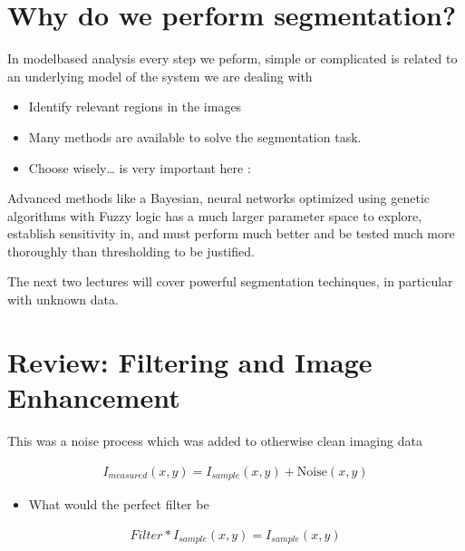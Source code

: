 \documentclass[letterpaper,10pt,english]{sphinxmanual}
\begin{document}
\section{Why do we perform segmentation?}
\label{\detokenize{04-BasicSegmentation:why-do-we-perform-segmentation}}
\sphinxAtStartPar
In model\sphinxhyphen{}based analysis every step we peform, simple or complicated is related to an underlying model of the system we are dealing with
\begin{itemize}
\item {} 
\sphinxAtStartPar
Identify relevant regions in the images

\item {} 
\sphinxAtStartPar
Many methods are available to solve the segmentation task.

\item {} 
\sphinxAtStartPar
Choose wisely…  is very important here : 

\end{itemize}

\sphinxAtStartPar
Advanced methods like a Bayesian, neural networks optimized using genetic algorithms with Fuzzy logic has a much larger parameter space to explore, establish sensitivity in, and must perform much better and be tested much more thoroughly than thresholding to be justified.

\sphinxAtStartPar
The next two lectures will cover powerful segmentation techinques, in particular with unknown data.


\section{Review: Filtering and Image Enhancement}
\label{\detokenize{04-BasicSegmentation:review-filtering-and-image-enhancement}}
\sphinxAtStartPar
This was a noise process which was added to otherwise clean imaging data


\begin{equation*}
\begin{split} I_{measured}(x,y) = I_{sample}(x,y) + \text{Noise}(x,y) \end{split}
\end{equation*}\begin{itemize}
\item {} 
\sphinxAtStartPar
What would the perfect filter be

\end{itemize}
\begin{equation*}
\begin{split} \textit{Filter} \ast I_{sample}(x,y) = I_{sample}(x,y) \end{split}
\end{equation*}
\end{document}
